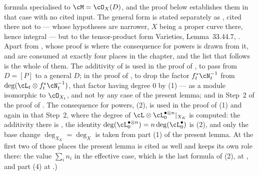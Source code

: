 \begin{lemma}
formula specialised to $\cM=\cO_X(D)$, and the proof below establishes
them in that case with no cited input.  The general form is stated
separately as , cited there not to
 --- whose hypotheses are narrower, $X$ being a
proper curve there, hence integral --- but to the tensor-product form
Varieties, Lemma~33.44.7, .  Apart from
, whose proof is where the consequence for
powers is drawn from it,  and
 are consumed at exactly four places in the
chapter, and the list that
follows is the whole of them.  The additivity of
 is used in the proof of
, to pass from $D=[P]$ to a
general $D$; in the proof of , to drop the
factor $f_t^*\cN_t^{-1}$ from $\deg(\cL_t\otimes f_t^*\cN_t^{-1})$, that
factor having degree $0$ by (1) --- as a
module isomorphic to $\cO_{X_t}$, and not by any case of the present
lemma; and in Step~2 of the proof of .  The
consequence for powers, (2), is used in the
proof of (1) and again in that
Step~2, where the degree of
$\cL\otimes\cL_0^{\bullet\otimes n}|_{X_K}$ is computed: the additivity
there is , the identity
$\deg(\cL_0^{\bullet\otimes n})=n\deg(\cL_0^{\bullet})$ is
(2), and only the base change
$\deg_{X_K}=\deg_X$ is taken from part (1) of the present lemma.  At the
first two of those places the present lemma is cited as well and keeps
its own role there: the value $\sum_in_i$ in the effective case, which
is the last formula of (2), at
, and part (4) at
.)

\end{lemma}
